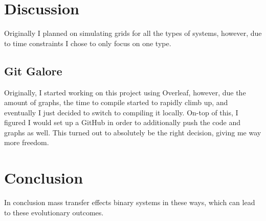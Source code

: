 \documentclass[12pt, letterpaper]{article}
\begin{document}

\section{\centering Discussion}   
    Originally I planned on simulating grids for all the types of systems, however, due to time constraints I chose to only focus on one type. 

    \subsection{Git Galore}
    Originally, I started working on this project using Overleaf, however, due the amount of graphs, the time to compile started to rapidly climb up, and eventually I just decided to switch to compiling it locally. On-top of this, I figured I would set up a GitHub in order to additionally push the code and graphs as well. This turned out to absolutely be the right decision, giving me way more freedom.
    
\section{\centering Conclusion}
    In conclusion mass transfer effects binary systems in these ways, which can lead to these evolutionary outcomes. 

\printbibliography[
heading=bibintoc,
title={\centering Sources}
]
\end{document}
